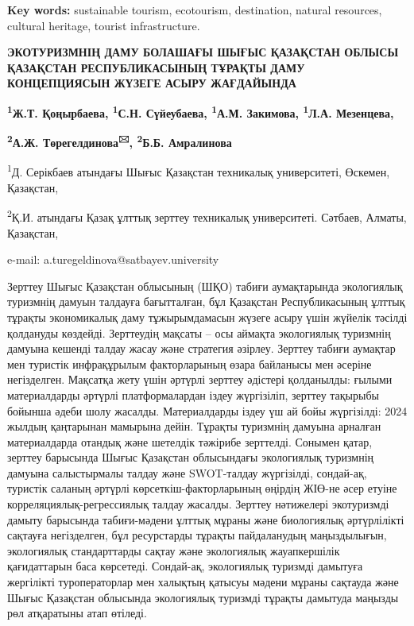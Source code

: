 {\bfseries Key words:} sustainable tourism, ecotourism, destination,
natural resources, cultural heritage, tourist infrastructure.

{\bfseries ЭКОТУРИЗМНІҢ ДАМУ БОЛАШАҒЫ ШЫҒЫС ҚАЗАҚСТАН ОБЛЫСЫ ҚАЗАҚСТАН
РЕСПУБЛИКАСЫНЫҢ ТҰРАҚТЫ ДАМУ КОНЦЕПЦИЯСЫН ЖҮЗЕГЕ АСЫРУ ЖАҒДАЙЫНДА}

{\bfseries \textsuperscript{1}Ж.Т. Қоңырбаева, \textsuperscript{1}С.Н.
Сүйеубаева, \textsuperscript{1}А.М. Закимова, \textsuperscript{1}Л.А.
Мезенцева,}

{\bfseries \textsuperscript{2}А.Ж. Төрегелдинова\textsuperscript{🖂},
\textsuperscript{2}Б.Б. Амралинова}

\textsuperscript{1}Д. Серікбаев атындағы Шығыс Қазақстан техникалық
университеті, Өскемен, Қазақстан,

\textsuperscript{2}Қ.И. атындағы Қазақ ұлттық зерттеу техникалық
университеті. Сәтбаев, Алматы, Қазақстан,

e-mail: a.turegeldinova@satbayev.university

Зерттеу Шығыс Қазақстан облысының (ШҚО) табиғи аумақтарында экологиялық
туризмнің дамуын талдауға бағытталған, бұл Қазақстан Республикасының
ұлттық тұрақты экономикалық даму тұжырымдамасын жүзеге асыру үшін
жүйелік тәсілді қолдануды көздейді. Зерттеудің мақсаты -- осы аймақта
экологиялық туризмнің дамуына кешенді талдау жасау және стратегия
әзірлеу. Зерттеу табиғи аумақтар мен туристік инфрақұрылым факторларының
өзара байланысы мен әсеріне негізделген. Мақсатқа жету үшін әртүрлі
зерттеу әдістері қолданылды: ғылыми материалдарды әртүрлі
платформалардан іздеу жүргізіліп, зерттеу тақырыбы бойынша әдеби шолу
жасалды. Материалдарды іздеу үш ай бойы жүргізілді: 2024 жылдың
қаңтарынан мамырына дейін. Тұрақты туризмнің дамуына арналған
материалдарда отандық және шетелдік тәжірибе зерттелді. Сонымен қатар,
зерттеу барысында Шығыс Қазақстан облысындағы экологиялық туризмнің
дамуына салыстырмалы талдау және SWOT-талдау жүргізілді, сондай-ақ,
туристік саланың әртүрлі көрсеткіш-факторларының өңірдің ЖІӨ-не әсер
етуіне корреляциялық-регрессиялық талдау жасалды. Зерттеу нәтижелері
экотуризмді дамыту барысында табиғи-мәдени ұлттық мұраны және
биологиялық әртүрлілікті сақтауға негізделген, бұл ресурстарды тұрақты
пайдаланудың маңыздылығын, экологиялық стандарттарды сақтау және
экологиялық жауапкершілік қағидаттарын баса көрсетеді. Сондай-ақ,
экологиялық туризмді дамытуға жергілікті туроператорлар мен халықтың
қатысуы мәдени мұраны сақтауда және Шығыс Қазақстан облысында
экологиялық туризмді тұрақты дамытуда маңызды рөл атқаратыны атап
өтіледі.


